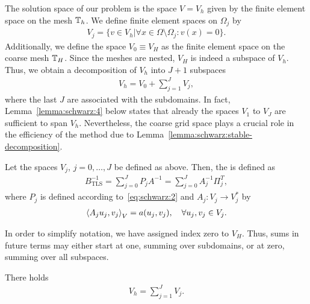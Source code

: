 \begin{notation}
  \label{par:schwarz:1}
  The solution space of our problem is the space $V=V_h$ given by the
  finite element space on the mesh $\mathbb T_h$. We define finite element
  spaces on $\Omega_j$ by
  \begin{gather}
    \label{eq:schwarz:9}
    V_j = \bigl\{ v\in V_h \big| \forall x\in\Omega\setminus\Omega_j :
    v(x) =0\bigr\}.
  \end{gather}
  Additionally, we define the space $V_0 \equiv V_H$ as the finite
  element space on the coarse mesh $\mathbb T_H$.  Since the meshes are
  nested, $V_H$ is indeed a subspace of $V_h$. Thus, we obtain a
  decomposition of $V_h$ into $J+1$ subspaces
  \begin{gather*}
    V_h = V_0 + \sum_{j=1}^J V_j,
  \end{gather*}
  where the last $J$ are associated with the subdomains. In fact,
  Lemma~\ref{lemma:schwarz:4} below states that already the spaces
  $V_1$ to $V_J$ are sufficient to span $V_h$. Nevertheless, the
  coarse grid space plays a crucial role in the efficiency of the
  method due to Lemma~\ref{lemma:schwarz:stable-decomposition}.
\end{notation}

\begin{definition}
  Let the spaces $V_j$, $j=0,\dots,J$ be defined as above. Then, the
   is defined as
  \begin{gather}
    \label{eq:schwarz:10}
    B^{-1}_{\text{TLS}} = \sum_{j=0}^J P_j A^{-1} = \sum_{j=0}^J A_j^{-1} \Pi^T_j,
  \end{gather}
  where $P_j$ is defined according to~\eqref{eq:schwarz:2} and $A_j:
  V_j\to V_j^*$ by
  \begin{gather}
    \scal(A_j u_j, v_j)_V = a(u_j, v_j),\quad\forall u_j, v_j \in V_j.
  \end{gather}
\end{definition}

\begin{note}
  In order to simplify notation, we have assigned index zero to
  $V_H$. Thus, sums in future terms may either start at one, summing
  over subdomains, or at zero, summing over all subspaces.
\end{note}

\begin{lemma}
  \label{lemma:schwarz:4}
  There holds
  \begin{gather}
    \label{eq:schwarz:11}
    V_h = \sum_{j=1}^J V_j.
  \end{gather}
\end{lemma}

